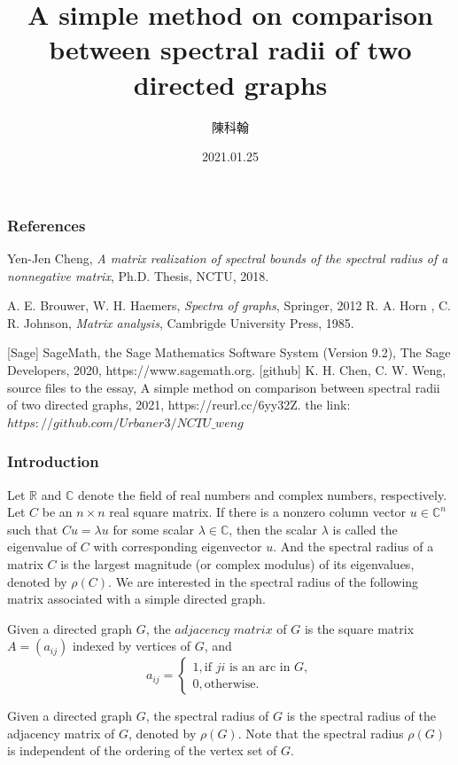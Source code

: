 \documentclass{beamer}
\title{A simple method on comparison between spectral radii of two directed graphs}
\author{陳科翰}
\institute[NCTU]{Mathematic department \\ NCTU}
\date{2021.01.25}
\begin{document}
\frame{\titlepage}

\begin{frame}
    \frametitle{References}
    \begin{thebibliography}{20}
        
        Yen-Jen Cheng, {\it  A matrix realization of spectral bounds
        of the spectral radius of a nonnegative matrix}, Ph.D. Thesis, NCTU, 2018.
        
        A. E. Brouwer, W. H. Haemers, {\it Spectra of graphs}, Springer, 2012
        R. A. Horn , C. R. Johnson, {\it Matrix analysis}, Cambrigde University Press, 1985.
         
        [Sage] SageMath, the Sage Mathematics Software System (Version 9.2),
               The Sage Developers, 2020, https://www.sagemath.org.  %
        [github] K. H. Chen, C. W. Weng, source files to the essay, A simple method on comparison between spectral radii of two directed graphs,
             2021, https://reurl.cc/6yy32Z. %
             \newblock the link: $https://github.com/Urbaner3/NCTU\_weng$

        \end{thebibliography}
\end{frame}

\begin{frame}
\frametitle{Introduction}
Let $\mathbb{R}$ and $\mathbb{C}$ denote the
 field of real numbers and complex numbers, respectively.
 Let $C$ be an $n\times n$ real square matrix. If there is
 a nonzero column vector $u\in\mathbb{C}^n$ such that
 $Cu=\lambda u$ for some scalar $\lambda\in\mathbb{C}$,
 then the scalar $\lambda$ is called the eigenvalue of
 $C$ with corresponding eigenvector $u$. And the spectral
 radius of a matrix $C$ is the largest magnitude (or complex
 modulus) of its eigenvalues, denoted by $\rho(C)$. We are
 interested in the spectral radius of the following matrix
associated with a simple directed graph.
\end{frame}


\begin{frame}
    \begin{definition}
        Given a directed graph $G$, the $\textit{adjacency matrix}$ of $G$ is the square
        matrix $A = (a_{ij})$ indexed by vertices of $G$, and
         \[a_{ij} =\begin{cases}
            1, \text{if $ji$ is an arc in $G$}, \\
            0, \text{otherwise.}
                \end{cases}
         \]
    \end{definition}
    Given a directed graph $G$, the spectral radius of $G$ is the
 spectral radius of the adjacency matrix of $G$, denoted by
 $\rho(G)$. Note that the spectral radius $\rho(G)$ is
 independent of the ordering of the vertex set of $G$. 

\end{frame}
\end{document}
